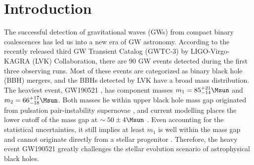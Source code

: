 \documentclass[
reprint,           %
superscriptaddress,%
amsmath,           %
amssymb,           %
aps,               %
prd,               %
notitlepage,       %
longbibliography,  %
floatfix,          %
nofootinbib,
]{revtex4-1}
\begin{document}
\maketitle

\section{Introduction}

The successful detection of gravitational waves (GWs) from compact binary coalescences \cite{LIGOScientific:2018mvr,LIGOScientific:2020ibl,LIGOScientific:2021djp} has led us into a new era of GW astronomy.
According to the recently released third GW Transient Catalog (GWTC-3) \cite{LIGOScientific:2021djp} by LIGO-Virgo-KAGRA (LVK) Collaboration, there are $90$ GW events detected during the first three observing runs. Most of these events are categorized as binary black hole (BBH) mergers, and the BBHs detected by LVK have a broad mass distribution. The heaviest event, GW190521 \cite{LIGOScientific:2020iuh}, has component masses $m_1 = 85^{+21}_{-14}\Msun$ and $m_2 = 66^{+17}_{-18}\Msun$. Both masses lie within upper black hole mass gap originated from pulsation pair-instability supernovae \cite{Marchant_2019}, and current modelling places the lower cutoff of the mass gap at $\sim 50\pm 4\Msun$ \cite{Belczynski:2016jno,Marchant_2019,Farmer_2019,Farmer:2020xne,Marchant:2020haw}.
Even accounting for the statistical uncertainties, it still implies at least $m_1$ is well within the mass gap and cannot originate directly from a stellar progenitor \cite{Anagnostou:2020tta}.
Therefore, the heavy event GW190521 greatly challenges the stellar evolution scenario of astrophysical black holes.
\end{document}
